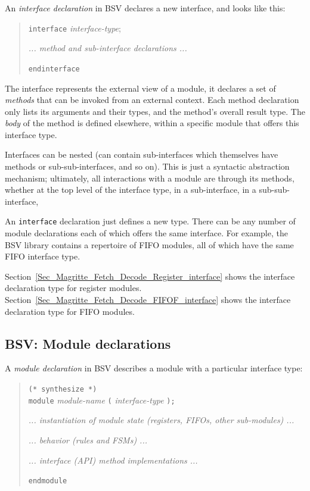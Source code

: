 
An \emph{interface declaration} in BSV declares a new interface, and
looks like this:

\begin{quote}
{\tt interface} \emph{interface-type};

\hmm \emph{... method and sub-interface declarations ...}

{\tt endinterface}
\end{quote}

The interface represents the external view of a module, {\ie} it
declares a set of \emph{methods} that can be invoked from an external
context.  Each method declaration only lists its arguments and their
types, and the method's overall result type.  The \emph{body} of the
method is defined elsewhere, within a specific module that offers this
interface type.

Interfaces can be nested (can contain sub-interfaces which themselves
have methods or sub-sub-interfaces, and so on).  This is just a
syntactic abstraction mechanism; ultimately, all interactions with a
module are through its methods, whether at the top level of the
interface type, in a sub-interface, in a sub-sub-interface, {\etc}

An \verb|interface| declaration just defines a new type.  There can be
any number of module declarations each of which offers the same
interface.  For example, the BSV library contains a repertoire of FIFO
modules, all of which have the same FIFO interface type.

Section~\ref{Sec_Magritte_Fetch_Decode_Register_interface} shows the
interface declaration type for register modules.
Section~\ref{Sec_Magritte_Fetch_Decode_FIFOF_interface} shows the
interface declaration type for FIFO modules.


\subsection{BSV: Module declarations}


A \emph{module declaration} in BSV describes a module with a
particular interface type:

\begin{quote}
{\tt (* synthesize *)} \\
{\tt module} \emph{module-name} {\tt (} \emph{interface-type} {\tt );}

\hmm \emph{... instantiation of module state (registers, FIFOs, other sub-modules) ...}

\hmm \emph{... behavior (rules and FSMs) ...}

\hmm \emph{... interface (API) method implementations ...}

{\tt endmodule}
\end{quote}

